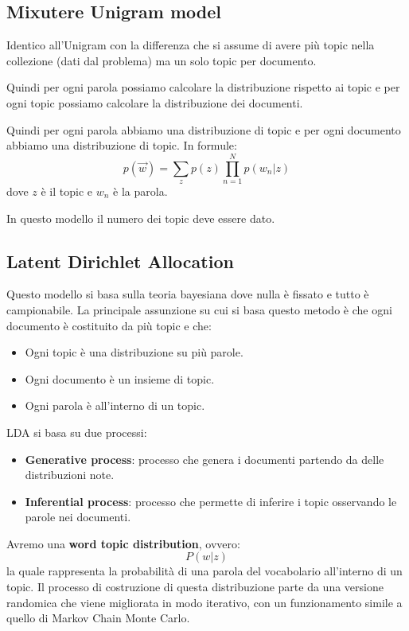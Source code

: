 \subsection{Mixutere Unigram model}
Identico all'Unigram con la differenza che si assume di avere più topic nella collezione (dati dal problema) ma 
un solo topic per documento. 

Quindi per ogni parola possiamo calcolare la distribuzione rispetto ai topic e 
per ogni topic possiamo calcolare la distribuzione dei documenti.

Quindi per ogni parola abbiamo una distribuzione di topic e per ogni documento
abbiamo una distribuzione di topic. In formule:
\begin{equation}
      p(\vec{w}) = \sum_z p(z) \prod_{n = 1}^{N} p(w_n|z)
\end{equation}
dove $z$ è il topic e $w_n$ è la parola.
\begin{nota}
      In questo modello il numero dei topic deve essere dato.
\end{nota}
\subsection{Latent Dirichlet Allocation}
Questo modello si basa sulla teoria bayesiana dove nulla è fissato e tutto è
campionabile. La principale assunzione su cui si basa questo metodo è che ogni
documento è costituito da più topic e che:
\begin{itemize}
      \item Ogni topic è una distribuzione su più parole.
      \item Ogni documento è un insieme di topic.
      \item Ogni parola è all'interno di un topic.
\end{itemize}
LDA si basa su due processi:
\begin{itemize}
      \item \textbf{Generative process}: processo che genera i documenti partendo
            da delle distribuzioni note.
      \item \textbf{Inferential process}: processo che permette di inferire i topic
            osservando le parole nei documenti.
\end{itemize}

Avremo una \textbf{word topic distribution}, ovvero:
\begin{equation*}
      P(w|z)
\end{equation*}
la quale rappresenta la probabilità di una parola del vocabolario all'interno di
un topic. Il processo di costruzione di questa distribuzione parte da una versione
randomica che viene migliorata in modo iterativo, con un funzionamento simile a
quello di Markov Chain Monte Carlo.


